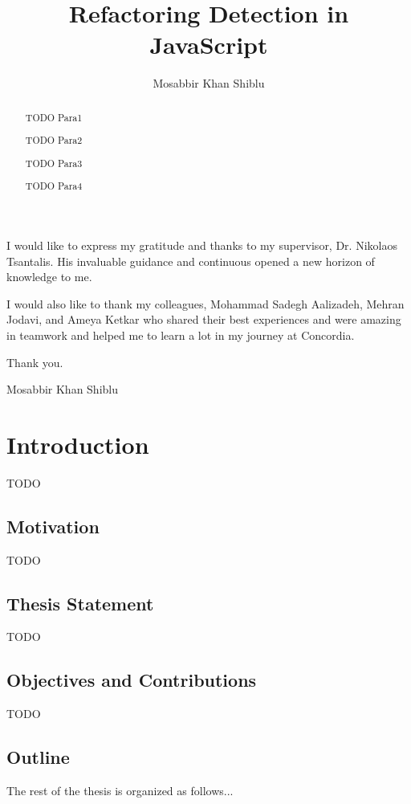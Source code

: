 \documentclass[letterpaper,12pt,onecolumn,final]{report}
\author{Mosabbir Khan Shiblu}
\title{Refactoring Detection in JavaScript}
\begin{document}
\begin{abstract}
{%
TODO Para1

TODO Para2


TODO Para3

TODO Para4
}
\end{abstract}

\begin{acknowledgments}

I would like to express my gratitude and thanks to my supervisor, Dr. Nikolaos Tsantalis. His invaluable guidance
and continuous opened a new horizon of knowledge to me.

I would also like to thank my colleagues, Mohammad Sadegh Aalizadeh, Mehran Jodavi, and Ameya Ketkar who shared their best experiences and were amazing in teamwork and helped me to learn a lot in my journey at Concordia.

Thank you.

Mosabbir Khan Shiblu
	
\end{acknowledgments}


\chapter{Introduction}

TODO %

\section{Motivation}
TODO

\section{Thesis Statement}
TODO

\section{Objectives and Contributions}
TODO

\section{Outline}
The rest of the thesis is organized as follows...
\end{document}
